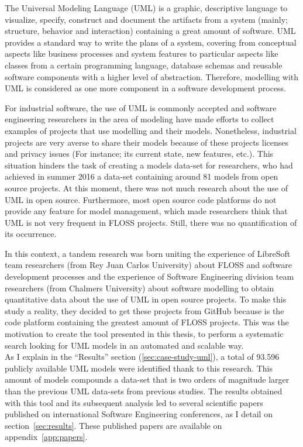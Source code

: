 \documentclass[a4paper, 12pt]{book}
\begin{document}
The Universal Modeling Language (UML) is a graphic, descriptive language to visualize, specify, construct and document the
artifacts from a system (mainly; structure, behavior and interaction) containing a great amount of software.
UML provides a standard way to write the plans of a system, covering from conceptual aspects like business processes and
system features to particular aspects like classes from a certain programming language, database schemas and reusable
software components with a higher level of abstraction. Therefore, modelling with UML is considered as one more component
in a software development process.\par
For industrial software, the use of UML is commonly accepted and software engineering researchers in the area of modeling
have made efforts to collect examples of projects that use modelling and their models. Nonetheless, industrial projects
are very averse to share their models because of these projects licenses and privacy issues (For instance; its current
state, new features, etc.).
This situation hinders the task of creating a models data-set for researchers, who had achieved in summer 2016 a data-set
containing around 81 models from open source projects. At this moment, there was not much research about the use of UML in open source.
Furthermore, most open source code platforms do not provide any feature for model management, which made researchers think that UML
is not very frequent in FLOSS projects.
Still, there was no quantification of its occurrence.\par
In this context, a tandem research was born uniting the experience of LibreSoft team researchers (from Rey Juan Carlos University) about
FLOSS and software development processes and the experience of Software Engineering division team researchers (from Chalmers University)
about software modelling to obtain quantitative data about the use of UML in open source projects. To make this study a reality, they
decided to get these projects from GitHub because is the code platform containing the greatest amount of FLOSS projects.
This was the motivation to create the tool presented in this thesis, to perform a systematic search looking for UML models in
an automated and scalable way.\\
As I explain in the ``Results'' section (\ref{sec:case-study-uml}), a total of 93.596 publicly available UML models were identified thank to this research.
This amount of models compounds a data-set that is two orders of magnitude larger than the previous UML data-sets from previous studies. The results
obtained with this tool and its subsequent analysis led to several scientific papers published on international Software Engineering conferences,
as I detail on section~\ref{sec:results}. These published papers are available on appendix~\ref{app:papers}.
\end{document}

